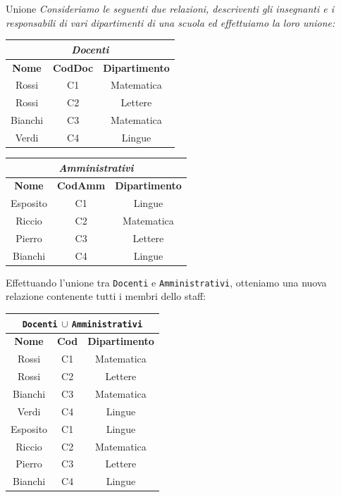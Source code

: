 \begin{Example}{Unione}{}
    \textit{Consideriamo le seguenti due relazioni, descriventi gli insegnanti e i responsabili di vari dipartimenti di una scuola ed effettuiamo la loro unione:}
    \begin{center}
        \begin{tabular}{|c|c|c|}
            \hline\multicolumn{3}{|c|}{\textit{Docenti}}\\\hline
            \textbf{Nome} & \textbf{CodDoc} & \textbf{Dipartimento}\\\hline
            Rossi & C1 & Matematica\\
            Rossi & C2 & Lettere\\
            Bianchi & C3 & Matematica\\
            Verdi & C4 & Lingue\\\hline
        \end{tabular}
        \begin{tabular}{|c|c|c|}
            \hline\multicolumn{3}{|c|}{\textit{Amministrativi}}\\\hline
            \textbf{Nome} & \textbf{CodAmm} & \textbf{Dipartimento}\\\hline
            Esposito & C1 & Lingue\\
            Riccio & C2 & Matematica\\
            Pierro & C3 & Lettere\\
            Bianchi & C4 & Lingue\\\hline
        \end{tabular}
        \bigskip
    \end{center}
    Effettuando l'unione tra \verb|Docenti| e \verb|Amministrativi|, otteniamo una nuova relazione contenente tutti i membri dello staff:
    \begin{center}
        \begin{tabular}{|c|c|c|}
            \hline\multicolumn{3}{|c|}{\Verb|Docenti| $\cup$ \Verb|Amministrativi|}\\\hline
            \textbf{Nome} & \textbf{Cod} & \textbf{Dipartimento}\\\hline
            Rossi & C1 & Matematica\\
            Rossi & C2 & Lettere\\
            Bianchi & C3 & Matematica\\
            Verdi & C4 & Lingue\\
            Esposito & C1 & Lingue\\
            Riccio & C2 & Matematica\\
            Pierro & C3 & Lettere\\
            Bianchi & C4 & Lingue\\\hline
        \end{tabular}
    \end{center}
\end{Example}


